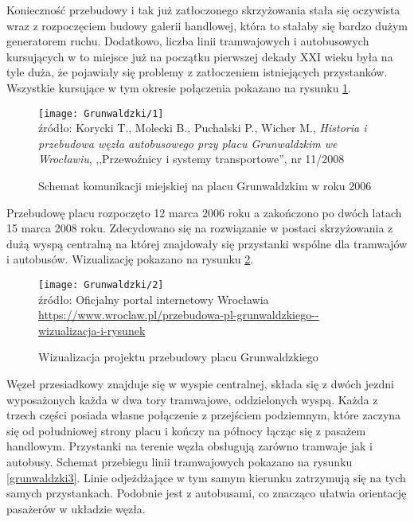 \documentclass[twoside,12pt]{article}
\begin{document}
	Konieczność przebudowy i tak już zatłoczonego skrzyżowania stała się oczywista wraz z rozpoczęciem budowy galerii handlowej, która to stałaby się bardzo dużym generatorem ruchu. Dodatkowo, liczba linii tramwajowych i autobusowych kursujących w to miejsce już na początku pierwszej dekady XXI wieku była na tyle duża, że pojawiały się problemy z zatłoczeniem istniejących przystanków. Wszystkie kursujące w tym okresie połączenia pokazano na rysunku \ref{grunwaldzki1}.
	
	\begin{figure}[H]
		\centering
		\caption{Schemat komunikacji miejskiej na placu Grunwaldzkim w roku 2006}
		\texttt{[image: Grunwaldzki/1]}\\
		\footnotesize{źródło: Korycki T., Molecki B., Puchalski P., Wicher M., \emph{Historia i przebudowa węzła autobusowego przy placu Grunwaldzkim we Wrocławiu}, ,,Przewoźnicy i systemy transportowe'', nr 11/2008 \cite{grunwaldzki1}}
		\label{grunwaldzki1}
	\end{figure}
	
	Przebudowę placu rozpoczęto 12 marca 2006 roku a zakończono po dwóch latach 15 marca 2008 roku. Zdecydowano się na rozwiązanie w postaci skrzyżowania z dużą wyspą centralną na której znajdowały się przystanki wspólne dla tramwajów i autobusów. Wizualizację pokazano na rysunku \ref{grunwaldzki2}. 
	
	\begin{figure}[H]
		\centering
		\caption{Wizualizacja projektu przebudowy placu Grunwaldzkiego}
		\texttt{[image: Grunwaldzki/2]}\\
		\footnotesize{źródło: Oficjalny portal internetowy Wrocławia %
		\url{https://www.wroclaw.pl/przebudowa-pl-grunwaldzkiego--wizualizacja-i-rysunek}}
		\label{grunwaldzki2}
	\end{figure}	
	
	Węzeł przesiadkowy znajduje się w wyspie centralnej, składa się z dwóch jezdni wyposażonych każda w dwa tory tramwajowe, oddzielonych wyspą. Każda z trzech części posiada własne połączenie z przejściem podziemnym, które zaczyna się od południowej strony placu i kończy na północy łącząc się z pasażem handlowym. Przystanki na terenie węzła obsługują zarówno tramwaje jak i autobusy. Schemat przebiegu linii tramwajowych pokazano na rysunku \ref{grunwaldzki3}. Linie odjeżdżające w tym samym kierunku zatrzymują się na tych samych przystankach. Podobnie jest z autobusami, co znacząco ułatwia orientację pasażerów w układzie węzła. 
	
\end{document}
